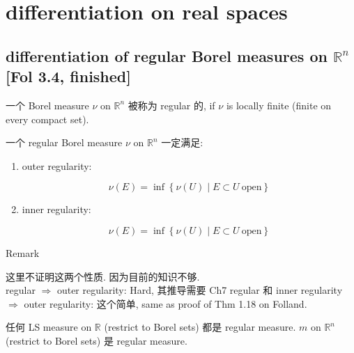 \chapter{differentiation on real spaces}\label{differentiation-on-real-spaces}

\section{\texorpdfstring{differentiation of regular Borel measures on \(\mathbb{R}^{n}\) {[}Fol 3.4, finished{]}}{differentiation of regular Borel measures on \textbackslash mathbb\{R\}\^{}\{n\} {[}Fol 3.4, finished{]}}}

\begin{definition}{}

一个 Borel measure \(\nu\) on \(\mathbb{R}^{n}\) 被称为 regular 的, if \(\nu\) is locally finite (finite on every compact set).

\end{definition}

\begin{theorem}{}

一个 regular Borel measure \(\nu\) on \(\mathbb{R}^{n}\) 一定满足:

\begin{enumerate}
\item
  outer regularity:

  \[\nu(E) = \inf\left\{ {\nu(U) \mid E \subset U\ \text{open}} \right\}\]
\item
  inner regularity:

  \[\nu(E) = \inf\left\{ {\nu(U) \mid E \subset U\ \text{open}} \right\}\]
\end{enumerate}

\end{theorem}

\begin{qlremark}{Remark}

这里不证明这两个性质. 因为目前的知识不够.\\
regular \(\Longrightarrow\) outer regularity: Hard, 其推导需要 Ch7 regular 和 inner regularity \(\Longrightarrow\) outer regularity: 这个简单, same as proof of Thm 1.18 on Folland.

\end{qlremark}

\begin{example}

任何 LS measure on \(\mathbb{R}\) (restrict to Borel sets) 都是 regular measure.  \(m\) on \(\mathbb{R}^{n}\) (restrict to Borel sets) 是 regular measure.

\end{example}

